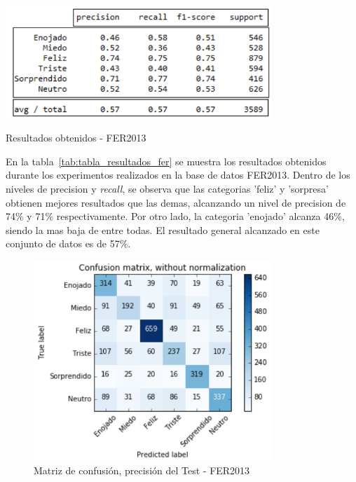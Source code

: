\begin{table}[H]
    \centering
    \includegraphics[width=100mm]{Imagenes/tabla_resultados_fer.png} 
    \caption{Resultados obtenidos - FER2013}
    \label{tab:tabla_resultados_fer}
\end{table}

En la tabla~\ref{tab:tabla_resultados_fer} se muestra los resultados obtenidos durante los experimentos realizados en la base de datos FER2013. Dentro de los niveles de precision y \textit{recall}, se observa que las categorias 'feliz' y 'sorpresa' obtienen mejores resultados que las demas, alcanzando un nivel de precision de 74\% y 71\% respectivamente. Por otro lado, la categoria 'enojado' alcanza 46\%, siendo la mas baja de entre todas. El resultado general alcanzado en este conjunto de datos es de 57\%.

\begin{figure}[H]
		\centering
		\includegraphics[width=90mm]{Imagenes/matriz_confusion_fer.png}
		\caption{Matriz de confusión, precisión del Test - FER2013}
		\label{fig:matriz_confusion_fer}
\end{figure}

